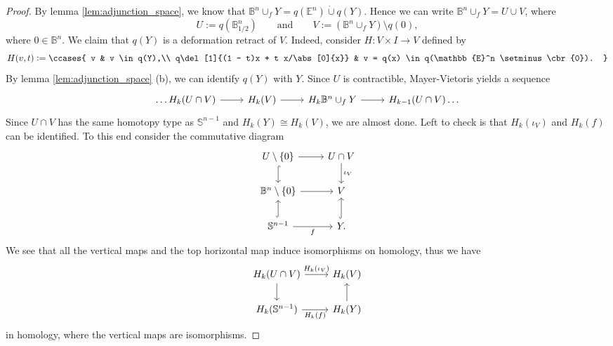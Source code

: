 \begin{proof}
	By lemma \ref{lem:adjunction_space}, we know that $\mathbb{B}^n \cup_f Y = q(\mathbb{E}^n) \dot{\cup} q(Y)$. Hence we can write $\mathbb{B}^n \cup_f Y = U \cup V$, where
	\begin{equation*}
		U := q(\mathbb{B}^n_{1/2}) \qquad \text{and} \qquad V := (\mathbb{B}^n \cup_f Y) \setminus q(0),
	\end{equation*}
	\noindent where $0 \in \mathbb{B}^n$. We claim that $q(Y)$ is a deformation retract of $V$. Indeed, consider $H : V \times I \to V$ defined by
	\begin{equation*}
		H(v,t) := \ccases{
			v & v \in q(Y),\\
			q\del[1]{(1 - t)x + t x/\abs[0]{x}} & v = q(x) \in q(\mathbb{E}^n \setminus \cbr{0}).
		}
	\end{equation*}
	By lemma \ref{lem:adjunction_space} (b), we can identify $q(Y)$ with $Y$. Since $U$ is contractible, Mayer-Vietoris yields a sequence
	\begin{equation*}
		\begin{tikzcd}
			\dots H_k (U \cap V) \arrow[r] & H_k(V) \arrow[r] & H_k{\mathbb{B}^n \cup_f Y} \arrow[r] & H_{k - 1}(U \cap V)\dots
		\end{tikzcd}
	\end{equation*}
	Since $U \cap V$ has the same homotopy type as $\mathbb{S}^{n - 1}$ and $H_k(Y) \cong H_k(V)$, we are almost done. Left to check is that $H_k(\iota_V)$ and $H_k(f)$ can be identified. To this end consider the commutative diagram
	\begin{equation*}
		\begin{tikzcd}
			U \setminus \cbr{0} \arrow[d,hook]\arrow[r] & U \cap V \arrow[d,"\iota_V"]\\
			\mathbb{B}^n \setminus \cbr{0} \arrow[r] & V\\
			\mathbb{S}^{n - 1}\arrow[u,hook] \arrow[r,"f"'] & Y \arrow[u,hook].
		\end{tikzcd}
	\end{equation*}
	We see that all the vertical maps and the top horizontal map induce isomorphisms on homology, thus we have
	\begin{equation*}
		\begin{tikzcd}
			H_k(U \cap V) \arrow[d]\arrow[r,"H_k(\iota_V)"] & H_k(V)\\
			H_k(\mathbb{S}^{n - 1}) \arrow[r,"H_k(f)"'] & H_k(Y) \arrow[u]
		\end{tikzcd}
	\end{equation*}
	\noindent in homology, where the vertical maps are isomorphisms.
\end{proof}

